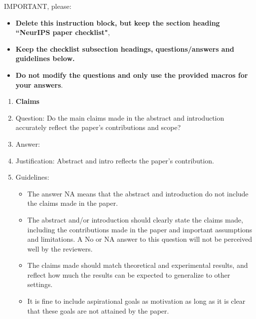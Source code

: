 \documentclass{article}
\begin{document}
{IMPORTANT, please:
\begin{itemize}
    \item {\bf Delete this instruction block, but keep the section heading ``NeurIPS paper checklist"},
    \item  {\bf Keep the checklist subsection headings, questions/answers and guidelines below.}
    \item {\bf Do not modify the questions and only use the provided macros for your answers}.
\end{itemize}




\begin{enumerate}

\item {\bf Claims}
    \item[] Question: Do the main claims made in the abstract and introduction accurately reflect the paper's contributions and scope?
    \item[] Answer: \answerYes{} %
    \item[] Justification: Abstract and intro reflects the paper's contribution.
    \item[] Guidelines:
    \begin{itemize}
        \item The answer NA means that the abstract and introduction do not include the claims made in the paper.
        \item The abstract and/or introduction should clearly state the claims made, including the contributions made in the paper and important assumptions and limitations. A No or NA answer to this question will not be perceived well by the reviewers.
        \item The claims made should match theoretical and experimental results, and reflect how much the results can be expected to generalize to other settings.
        \item It is fine to include aspirational goals as motivation as long as it is clear that these goals are not attained by the paper.
    \end{itemize}


\end{enumerate}}
\end{document}
